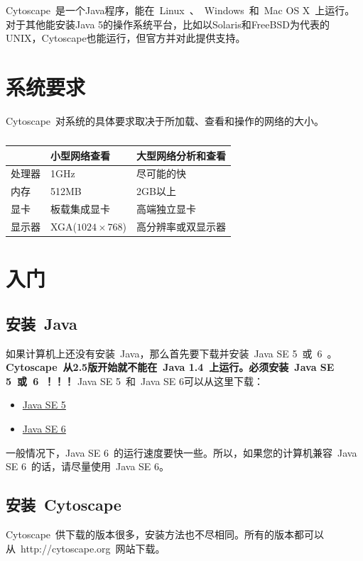 

Cytoscape~是一个Java程序，能在~Linux~、~Windows~和~Mac OS X~上运行。对于其他能安装Java 5的操作系统平台，比如以Solaris和FreeBSD为代表的UNIX，Cytoscape也能运行，但官方并对此提供支持。

\section{系统要求}
	Cytoscape~对系统的具体要求取决于所加载、查看和操作的网络的大小。

	\begin{table}[htbp]
	\label{tabel:2}
	\centering
	\begin{tabular}{|l|l|l|}
	\hline
	 & 小型网络查看 & 大型网络分析和查看 \\
	\hline
	处理器 & 1GHz & 尽可能的快\\
	\hline
	内存   & 512MB & 2GB以上 \\
	\hline
	显卡   & 板载集成显卡 & 高端独立显卡 \\
	\hline
	显示器 & XGA($1024 \times 768$) & 高分辨率或双显示器 \\
	\hline
	\end{tabular}
	\caption{}
	\end{table}

\section{入门}
	\subsection{安装~Java}
		如果计算机上还没有安装~Java，那么首先要下载并安装~Java SE 5~或~6~。\textbf{Cytoscape~从2.5版开始就不能在~Java 1.4~上运行。必须安装~Java SE 5~或~6~！！！}
		Java SE 5~和~Java SE 6可以从这里下载：
		\begin{itemize}
		\item \href{http://java.sun.com/javase/downloads/index_jdk5.jsp}{Java SE 5}
		\item \href{http://java.sun.com/javase/downloads/index.jsp}{Java SE 6}
		\end{itemize}
	
		一般情况下，Java SE 6~的运行速度要快一些。所以，如果您的计算机兼容~Java SE 6~的话，请尽量使用~Java SE 6。

	\subsection{安装~Cytoscape}
		Cytoscape~供下载的版本很多，安装方法也不尽相同。所有的版本都可以从~http://cytoscape.org~网站下载。
		
